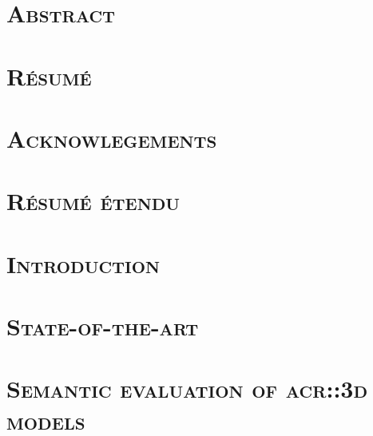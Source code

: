 \documentclass[12pt, twoside]{book}
\begin{document}
    \dominitoc
    \doparttoc
    \frontmatter
    \pagestyle{plain}
   
    
    
    \chapter{\textsc{Abstract}}
        
    \chapter{\textsc{Résumé}}
        

    \chapter{\textsc{Acknowlegements}}
        

    \chapter{\textsc{Résumé étendu}}
        

    \printglossary[type=\acronymtype]
    \printglossary

    \mtcaddchapter
    \tableofcontents
    \mtcaddchapter
    \listoffigures
    \mtcaddchapter
    \listoftables
    \mtcaddchapter

    \mainmatter

    \chapter{\textsc{Introduction}}
        \label{chap::introduction}
        
    
    \chapter{\textsc{State-of-the-art}}
        \label{chap::state_of_the_art}
        

    \chapter{\textsc{Semantic evaluation of \texorpdfstring{\gls*{acr::3d}}{3D} models}}
        \label{chap::semantic_evaluation}
        
\end{document}
